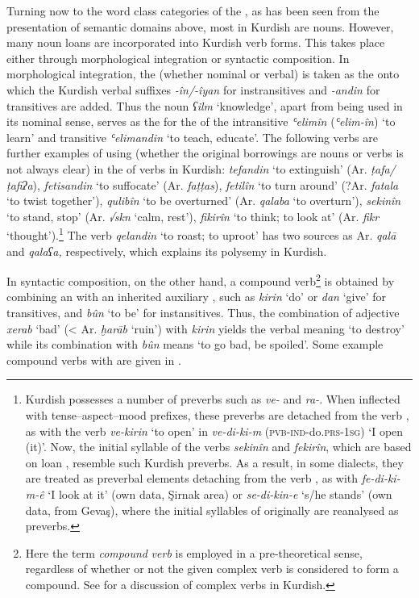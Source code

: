 \documentclass[output=paper]{langsci/langscibook}
\begin{document}
Turning now to the word class categories of the , as has been seen from the presentation of semantic domains above, most   in Kurdish are nouns. However, many  noun loans are incorporated into Kurdish verb forms. This takes place either through morphological integration or syntactic composition. In morphological integration, the   (whether nominal or verbal) is taken as the  onto which the Kurdish verbal suffixes \textit{-în/-îyan} for instransitives and \textit{{}-andin} for transitives are added. Thus the  noun \textit{ʕilm} ‘knowledge’, apart from being used in its nominal sense, serves as the  for the  of the intransitive \textit{ʿelimîn} (\textit{ʿelim-în}) ‘to learn’ and transitive \textit{ʿelimandin} ‘to teach, educate’. The following verbs are further examples of using   (whether the original borrowings are nouns or verbs is not always clear) in the  of verbs in Kurdish: \textit{tefandin} ‘to extinguish’ (Ar. \textit{ṭafa/ṭafiʔa}), \textit{fetisandin} ‘to suffocate’ (Ar. \textit{faṭṭas}), \textit{fetilîn} ‘to turn around’ (?Ar. \textit{fatala} ‘to twist together’), \textit{qulibîn} ‘to be overturned’ (Ar. \textit{qalaba} ‘to overturn’), \textit{sekinîn} ‘to stand, stop’ (Ar. \textit{√skn} ‘calm, rest’), \textit{fikirîn} ‘to think; to look at’ (Ar. \textit{fikr} ‘thought’).\footnote{Kurdish possesses a number of preverbs such as \textit{ve-} and \textit{ra-}. When inflected with tense--aspect--mood prefixes, these preverbs are detached from the verb , as with the verb \textit{ve-kirin} ‘to open’ in \textit{ve-di-ki-m} (\textsc{pvb-ind}{}-do.\textsc{prs-1sg}) ‘I open (it)’. Now, the initial syllable of the verbs \textit{sekinîn} and \textit{fekirîn}, which are based on  loan , resemble such Kurdish preverbs. As a result, in some dialects, they are treated as preverbal elements detaching from the verb , as with \textit{fe-di-ki-m-ê} ‘I look at it’ (own data, Şirnak area) or \textit{se-di-kin-e} ‘s/he stands’ (own data, from Gevaş), where the initial syllables of originally   are reanalysed as preverbs.}  The verb \textit{qelandin} ‘to roast; to uproot’ has two sources as Ar. \textit{qalā} and \textit{qalaʕa,} respectively, which explains its polysemy in Kurdish. 

In syntactic composition, on the other hand, a compound verb\footnote{Here the term \textit{compound} \textit{verb} is employed in a pre-theoretical sense, regardless of whether or not the given complex verb is considered to form a compound. See \citet{Haig2002} for a discussion of complex verbs in Kurdish.}  is obtained by combining an   with an inherited auxiliary , such as \textit{kirin} ‘do’ or \textit{dan} ‘give’ for transitives, and \textit{bûn} ‘to be’ for instansitives. Thus, the combination of  adjective  \textit{xerab} ‘bad’ (< Ar. \textit{ḫarāb} ‘ruin’) with \textit{kirin} yields the verbal meaning ‘to destroy’ while its combination with \textit{bûn} means ‘to go bad, be spoiled’. Some example compound verbs with   are given in .
\end{document}

